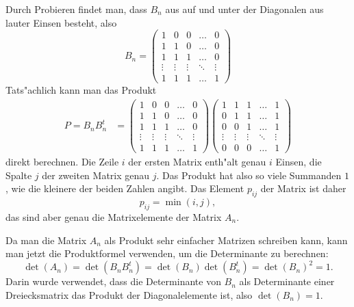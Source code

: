 \begin{loesung}
Durch Probieren findet man, dass $B_n$ aus auf und unter der Diagonalen aus
lauter Einsen besteht, also
\[
B_n
=
\begin{pmatrix}
     1&     0&     0&\dots &     0\\
     1&     1&     0&\dots &     0\\
     1&     1&     1&\dots &     0\\
\vdots&\vdots&\vdots&\ddots&\vdots\\
     1&     1&     1&\dots &     1
\end{pmatrix}
\]
Tats"achlich kann man das Produkt
\begin{align*}
P=B_nB_n^t
&=
\begin{pmatrix}
     1&     0&     0&\dots &     0\\
     1&     1&     0&\dots &     0\\
     1&     1&     1&\dots &     0\\
\vdots&\vdots&\vdots&\ddots&\vdots\\
     1&     1&     1&\dots &     1
\end{pmatrix}
\begin{pmatrix}
     1&     1&     1&\dots &     1\\
     0&     1&     1&\dots &     1\\
     0&     0&     1&\dots &     1\\
\vdots&\vdots&\vdots&\ddots&\vdots\\
     0&     0&     0&\dots &     1
\end{pmatrix}
\end{align*}
direkt berechnen.
Die Zeile $i$ der ersten Matrix enth"alt genau $i$ Einsen, die Spalte $j$ 
der zweiten Matrix genau $j$.
Das Produkt hat also so viele Summanden $1$, wie die kleinere der beiden
Zahlen angibt.
Das Element $p_{ij}$ der Matrix ist daher
\[
p_{ij}=\min(i,j),
\]
das sind aber genau die Matrixelemente der Matrix $A_n$.

Da man die Matrix $A_n$ als Produkt sehr einfacher Matrizen schreiben kann,
kann man jetzt die Produktformel verwenden, um die Determinante zu berechnen:
\[
\det(A_n)=\det(B_nB_n^t)=\det(B_n)\det(B_n^t)=\det(B_n)^2=1.
\]
Darin wurde verwendet, dass die Determinante von $B_n$ als Determinante
einer Dreiecksmatrix das Produkt der Diagonalelemente ist, also
$\det(B_n)=1$. 
\end{loesung}

